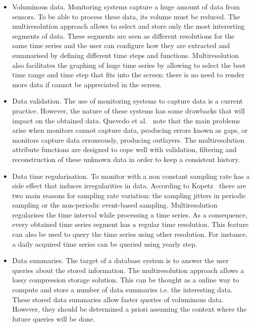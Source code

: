 \begin{itemize}
\item Voluminous data. Monitoring systems capture a huge amount of
  data from sensors. To be able to process these data, its volume must
  be reduced. The multiresolution approach allows to select and store
  only the most interesting segments of data. These segments are seen
  as different resolutions for the same time series and the user can
  configure how they are extracted and summarised by defining
  different time steps and functions. Multiresolution also facilitates
  the graphing of huge time series by allowing to select the best time
  range and time step that fits into the screen: there is no need to
  render more data if cannot be appreciated in the screen.

\item Data validation. The use of monitoring systems to capture data
  is a current practice. However, the nature of these systems has some
  drawbacks that will impact on the obtained data. Quevedo et
  al.~\cite{quevedo10} note that the main problems arise when monitors
  cannot capture data, producing errors known as gaps, or monitors
  capture data erroneously, producing outlayers.  The multiresolution
  attribute functions are designed to cope well with validation,
  filtering and reconstruction of these unknown data in order to keep
  a consistent history.

\item Data time regularisation. To monitor with a non constant
  sampling rate has a side effect that induces irregularities in data.
  According to Kopetz~\cite{kopetz11:realtime} there are two main
  reasons for sampling rate variation: the sampling jitters in
  periodic sampling or the non-periodic event-based sampling.
  Multiresolution regularises the time interval while processing a
  time series. As a consequence, every obtained time series segment
  has a regular time resolution. This feature can also be used to
  query the time series using other resolution. For instance, a daily
  acquired time series can be queried using yearly step.

\item Data summaries. The target of a database system is to answer the
  user queries about the stored information. The multiresolution
  approach allows a lossy compression storage solution. This can be
  thought as a online way to compute and store a number of data
  summaries i.e. the interesting data. These stored data summaries
  allow faster queries of voluminous data. However, they should be
  determined a priori assuming the context where the future queries
  will be done.
\end{itemize}


